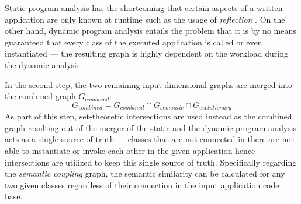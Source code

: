 \documentclass[12pt,a4paper]{report}
\begin{document}
Static program analysis has the shortcoming that certain aspects of a written
application are only known at runtime such as the usage of
\textit{reflection} \cite{landman2017reflection}.
On the other hand, dynamic program analysis entails the problem that
it is by no means guaranteed that every class of the executed application
is called or even instantiated --- the resulting graph is highly dependent
on the workload during the dynamic analysis.

In the second step, the two remaining input dimensional graphs are merged into
the combined graph \(G_{combined}\):
\[
  G_{combined} = G_{combined} \cap G_{semantic} \cap G_{evolutionary}
\]
As part of this step, set-theoretic intersections are used instead as the
combined graph resulting out of the merger of the static and the dynamic
program analysis acts as a single source of truth --- classes that are not
connected in there are not able to instantiate or invoke each other in the
given application hence intersections are utilized to keep this single source
of truth.
Specifically regarding the \textit{semantic coupling} graph, the semantic
similarity can be calculated for any two given classes regardless of their
connection in the input application code base.
\end{document}
